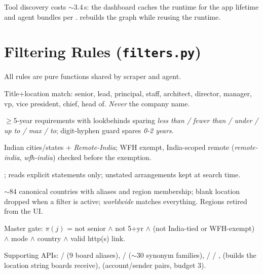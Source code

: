 \documentclass[11pt,a4paper]{article}
\newcommand{\file}[1]{\texttt{\small #1}}
\begin{document}
Tool discovery costs $\sim$3.4\,s: the dashboard caches the runtime for the
app lifetime and agent bundles per .
 rebuilds the graph while reusing the
runtime.

\section{Filtering Rules (\file{filters.py})}
\label{sec:filters}

All rules are pure functions shared by scraper and agent.

\begin{description}[leftmargin=6.4em, style=nextline]
  \item[SENIORITY\_FILTER] Title+location match: senior, lead, principal,
        staff, architect, director, manager, vp, vice president, chief,
        head of. \emph{Never} the company name.
  \item[EXPERIENCE\_FILTER] $\geq$5-year requirements with lookbehinds
        sparing \emph{less than / fewer than / under / up to / max / to};
        digit-hyphen guard spares \emph{0-2 years}.
  \item[INDIA\_TOKENS] Indian cities/states + \emph{Remote-India}; WFH
        exempt, India-scoped remote (\emph{remote-india}, \emph{wfh-india})
        checked before the exemption.
  \item[Work modes] ;
         reads explicit statements only;
        unstated arrangements kept at search time.
  \item[Countries / regions] $\sim$84 canonical countries with aliases and
        region membership; blank location dropped when a filter is active;
        \emph{worldwide} matches everything. Regions retired from the UI.
  \item[keep\_job] Master gate: $\pi(j)$ = not senior $\wedge$ not 5+yr
        $\wedge$ (not India-tied or WFH-exempt) $\wedge$ mode $\wedge$
        country $\wedge$ valid http(s) link.
\end{description}

Supporting APIs:  /  (9 board
aliases),  /  ($\sim$30
synonym families),  / 
/ ,  (builds the location
string boards receive),  (account/sender pairs,
budget 3).
\end{document}
